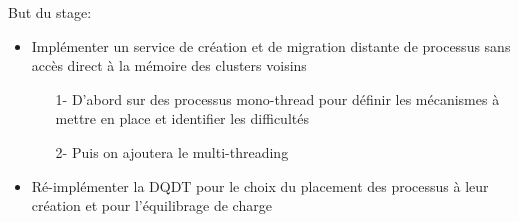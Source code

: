\documentclass[t]{beamer}
\begin{document}
      \begin{frame}{\secname}
        \vspace{2cm}
        But du stage:
        \begin{itemize}   
          \item Implémenter un service de création et de migration distante de processus sans accès direct à
            la mémoire des clusters voisins
            \begin{itemize}
              \item[1-] D'abord sur des processus mono-thread pour définir les
                mécanismes à mettre en place et identifier les difficultés
              \item[2-] Puis on ajoutera le multi-threading
            \end{itemize}
          \item Ré-implémenter la DQDT pour le choix du placement des processus à leur
            création et pour l'équilibrage de charge
        \end{itemize}
      \end{frame}




\end{document}

